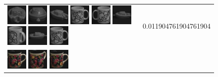 \begin{figure}[tbp]
\begin{center}
\begin{tabular}{m{11cm} | m{3cm} |}
\includegraphics[width=1cm]{coil/beeld-26.eps}
\includegraphics[width=1cm]{coil/beeld-28.eps}
\includegraphics[width=1cm]{coil/beeld-25.eps}
\includegraphics[width=1cm]{coil/beeld-48.eps}
\includegraphics[width=1cm]{coil/beeld-51.eps}
\includegraphics[width=1cm]{coil/beeld-24.eps}
\includegraphics[width=1cm]{coil/beeld-49.eps}
\includegraphics[width=1cm]{coil/beeld-27.eps}
\includegraphics[width=1cm]{coil/beeld-48.eps}
& {\scriptsize 0.011904761904761904}
\\
\includegraphics[width=1cm]{coil/beeld-60.eps}
\includegraphics[width=1cm]{coil/beeld-63.eps}
\includegraphics[width=1cm]{coil/beeld-60.eps}

\end{tabular}
\end{center}
\end{figure}
